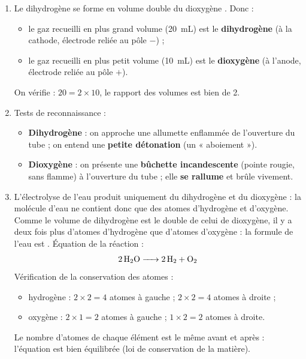\documentclass[11pt]{article}
\begin{document}
\begin{corrige}
\begin{enumerate}
\item Le dihydrogène  se forme en volume double du dioxygène . Donc :
\begin{itemize}
\item le gaz recueilli en plus grand volume (\SI{20}{mL}) est le \textbf{dihydrogène}  (à la cathode, électrode reliée au pôle $-$) ;
\item le gaz recueilli en plus petit volume (\SI{10}{mL}) est le \textbf{dioxygène}  (à l'anode, électrode reliée au pôle $+$).
\end{itemize}
On vérifie : $20 = 2 \times 10$, le rapport des volumes est bien de 2.
\item Tests de reconnaissance :
\begin{itemize}
\item \textbf{Dihydrogène} : on approche une allumette enflammée de l'ouverture du tube ; on entend une \textbf{petite détonation} (un « aboiement »).
\item \textbf{Dioxygène} : on présente une \textbf{bûchette incandescente} (pointe rougie, sans flamme) à l'ouverture du tube ; elle \textbf{se rallume} et brûle vivement.
\end{itemize}
\item L'électrolyse de l'eau produit uniquement du dihydrogène et du dioxygène : la molécule d'eau ne contient donc que des atomes d'hydrogène et d'oxygène. Comme le volume de dihydrogène est le double de celui de dioxygène, il y a deux fois plus d'atomes d'hydrogène que d'atomes d'oxygène : la formule de l'eau est .
Équation de la réaction :
\[ \ce{2H2O -> 2H2 + O2} \]
Vérification de la conservation des atomes :
\begin{itemize}
\item hydrogène : $2 \times 2 = 4$ atomes à gauche ; $2 \times 2 = 4$ atomes à droite ;
\item oxygène : $2 \times 1 = 2$ atomes à gauche ; $1 \times 2 = 2$ atomes à droite.
\end{itemize}
Le nombre d'atomes de chaque élément est le même avant et après : l'équation est bien équilibrée (loi de conservation de la matière).
\end{enumerate}
\end{corrige}
\end{document}
